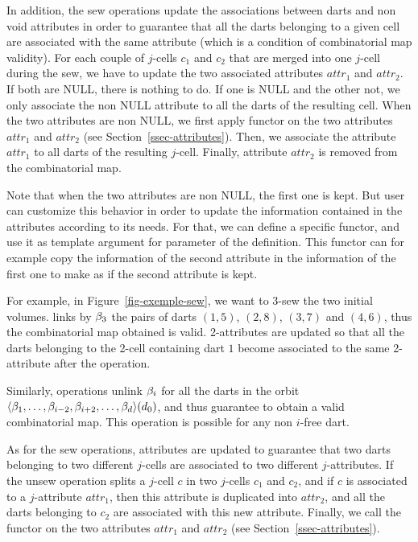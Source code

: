In addition, the sew operations update the associations between darts
and non void attributes in order to guarantee that all the darts
belonging to a given cell are associated with the same attribute
(which is a condition of combinatorial map validity).  For each couple
of $j$-cells $c_1$ and $c_2$ that are merged into one $j$-cell during
the sew, we have to update the two associated attributes $attr_1$ and
$attr_2$.  If both are NULL, there is nothing to do.  If one is NULL
and the other not, we only associate the non NULL attribute to all the
darts of the resulting cell.  When the two attributes are non NULL, we
first apply functor  on the two attributes $attr_1$ and
$attr_2$ (see Section~\ref{ssec-attributes}). Then, we associate the
attribute $attr_1$ to all darts of the resulting $j$-cell. Finally,
attribute $attr_2$ is removed from the combinatorial map. 

Note that when the two attributes are non NULL, the first one is
kept. But user can customize this behavior in order to update the
information contained in the attributes according to its needs.  For
that, we can define a specific functor, and use it as template
argument for  parameter of the 
definition. This functor can for example copy the information of the
second attribute in the information of the first one to make as if the
second attribute is kept.

For example, in Figure~\ref{fig-exemple-sew}, we want to 3-sew the two
initial volumes.  links by $\beta_{3}$ the pairs of
darts $(1,5)$, $(2,8)$, $(3,7)$ and $(4,6)$, thus the combinatorial map
obtained is valid. 2-attributes are updated so that all the darts
belonging to the 2-cell containing dart $1$ become associated to the
same 2-attribute after the operation.
%

Similarly,  operations unlink $\beta_{i}$ for all the darts
in the orbit $\langle{}\beta_{1},\ldots,\beta_{i-2},\beta_{i+2},\ldots,\beta_{d}\rangle{}(d_0)$, 
and thus guarantee to obtain a valid combinatorial map.  This
operation is possible for any non $i$-free dart.

As for the sew operations, attributes are updated to
guarantee that two darts belonging to two different $j$-cells are
associated to two different $j$-attributes.  If the unsew operation
splits a $j$-cell $c$ in two $j$-cells $c_1$ and $c_2$, and if $c$ is
associated to a $j$-attribute $attr_1$, then this attribute is duplicated
into $attr_2$, and all the darts belonging to $c_2$ are associated
with this new attribute.  Finally, we call the functor 
on the two attributes $attr_1$ and $attr_2$ (see
Section~\ref{ssec-attributes}).

